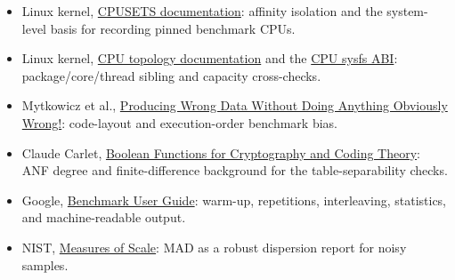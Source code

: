 \documentclass[11pt,a4paper]{article}
\begin{document}
{\begin{itemize}
    {Game Dev Guide for 12th Gen Intel Core Processor}: hybrid CPUID flag,
    per-logical-CPU leaf 0x1a core type, and affinity-pinned probing.
  \item Linux kernel,
    \href{https://www.kernel.org/doc/html/latest/admin-guide/cgroup-v1/cpusets.html}
    {CPUSETS documentation}: affinity isolation and the system-level basis for
    recording pinned benchmark CPUs.
  \item Linux kernel,
    \href{https://docs.kernel.org/admin-guide/cputopology.html}
    {CPU topology documentation} and the
    \href{https://github.com/torvalds/linux/blob/master/Documentation/ABI/testing/sysfs-devices-system-cpu}
    {CPU sysfs ABI}: package/core/thread sibling and capacity cross-checks.
  \item Mytkowicz et al.,
    \href{https://sape.inf.usi.ch/publications/asplos09.html}
    {Producing Wrong Data Without Doing Anything Obviously Wrong!}: code-layout
    and execution-order benchmark bias.
  \item Claude Carlet,
    \href{https://doi.org/10.1017/9781108606806}
    {Boolean Functions for Cryptography and Coding Theory}: ANF degree and
    finite-difference background for the table-separability checks.
  \item Google,
    \href{https://github.com/google/benchmark/blob/main/docs/user_guide.md}
    {Benchmark User Guide}: warm-up, repetitions, interleaving, statistics, and
    machine-readable output.
  \item NIST,
    \href{https://www.itl.nist.gov/div898/handbook/eda/section3/eda356.htm}
    {Measures of Scale}: MAD as a robust dispersion report for noisy samples.
\end{itemize}
}
\end{document}
